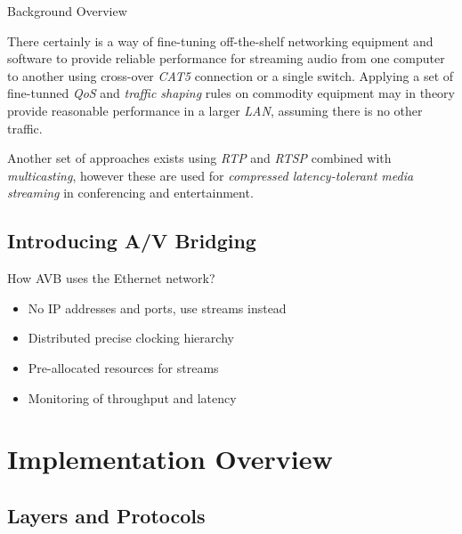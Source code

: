 \documentclass{beamer}
\begin{document}
\begin{frame}[allowframebreaks]{ Background Overview }
\begin{itemize}
\break

There certainly is a way of fine-tuning off-the-shelf networking equipment and software to provide
reliable performance for streaming audio from one computer to another using cross-over \emph{CAT5}
connection or a single switch. Applying a set of fine-tunned \emph{QoS} and \emph{traffic shaping}
rules on commodity equipment may in theory provide reasonable performance in a larger \emph{LAN},
\newline assuming there is no other traffic.

Another set of approaches exists using \emph{RTP} and \emph{RTSP} combined with \emph{multicasting}, however these
are used for \emph{compressed latency-tolerant media streaming} in conferencing and entertainment.


\end{itemize}

\end{frame}


\subsection{Introducing A/V Bridging}

\begin{frame}{ How AVB uses the Ethernet network? }

\begin{itemize}
	\item No IP addresses and ports, use streams instead
	\item Distributed precise clocking hierarchy
	\item Pre-allocated resources for streams
	\item Monitoring of throughput and latency
\end{itemize}

\end{frame}


\section{Implementation Overview}

\subsection{Layers and Protocols}
\end{document}
